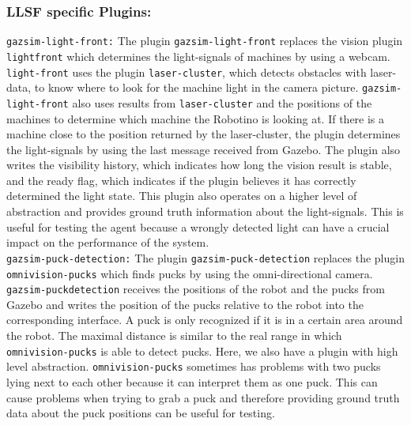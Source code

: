 \subsubsection{LLSF specific Plugins:}

\texttt{gazsim-light-front:}
The plugin \texttt{gazsim-light-front} replaces the vision plugin \texttt{light\-front} which determines the light-signals of machines by using a webcam. \texttt{light-front} uses the plugin \texttt{laser-cluster}, which detects obstacles with laser-data, to know where to look for the machine light in the camera picture. \texttt{gazsim-light-front} also uses results from \texttt{laser-cluster} and the positions of the machines to determine which machine the Robotino is looking at. If there is a machine close to the position returned by the laser-cluster, the plugin determines the light-signals by using the last message received from Gazebo. The plugin also writes the visibility history, which indicates how long the vision result is stable, and the ready flag, which indicates if the plugin believes it has correctly determined the light state. This plugin also operates on a higher level of abstraction and provides ground truth information about the light-signals. This is useful for testing the agent because a wrongly detected light can have a crucial impact on the performance of the system.
\\

\texttt{gazsim-puck-detection:}
The plugin \texttt{gazsim-puck-detection} replaces the plugin \texttt{omnivision-pucks} which finds pucks by using the omni-directional camera. \texttt{gazsim-puck\-detection} receives the positions of the robot and the pucks from Gazebo and writes the position of the pucks relative to the robot into the corresponding interface. A puck is only recognized if it is in a certain area around the robot. The maximal distance is similar to the real range in which \texttt{omnivision-pucks} is able to detect pucks. Here, we also have a plugin with high level abstraction. \texttt{omnivision-pucks} sometimes has problems with two pucks lying next to each other because it can interpret them as one puck. This can cause problems when trying to grab a puck and therefore providing ground truth data about the puck positions can be useful for testing.
\\

